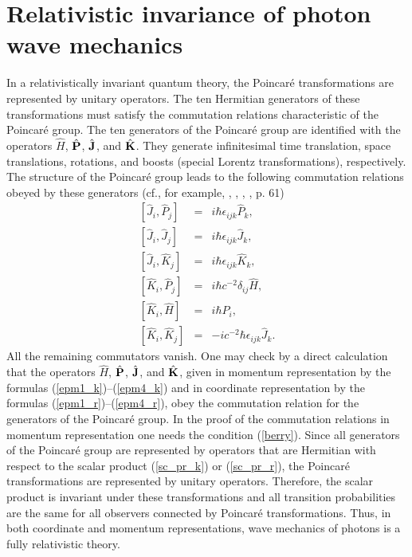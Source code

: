 \documentclass[11pt]{article}
\begin{document}
\section[RELATIVISTIC INVARIANCE]{Relativistic invariance of photon wave
mechanics\label{invariance}}

In a relativistically invariant quantum theory, the Poincar\'e
transformations are represented by unitary operators. The ten Hermitian
generators of these transformations must satisfy the commutation relations
characteristic of the Poincar\'e group. The ten generators of the Poincar\'e
group are identified with the operators ${\hat H}$, ${\hat{\bf P}}$,
${\hat{\bf J}}$, and ${\hat{\bf K}}$. They generate infinitesimal time
translation, space translations, rotations, and boosts (special Lorentz
transformations), respectively. The structure of the Poincar\'e group leads
to the following commutation relations obeyed by these generators (cf., for
example, \cite{BW_48}, \cite{BBBB_75}, \cite{IZ_80}, \cite{Weinberg_95}, p.
61)
\begin{eqnarray}
 \left[{\hat J}_i,{\hat P}_j\right] &=& i\hbar \epsilon_{ijk}{\hat P}_k,
 \label{cmp}\\
 \left[{\hat J}_i,{\hat J}_j\right] &=& i\hbar \epsilon_{ijk}{\hat J}_k,
 \label{cmm}\\
 \left[{\hat J}_i,{\hat K}_j\right] &=& i\hbar \epsilon_{ijk}{\hat K}_k,
 \label{cmn}\\
 \left[{\hat K}_i,{\hat P}_j\right] &=& i\hbar  c^{-2}\delta_{ij}{\hat H},
 \label{cnp}\\
 \left[{\hat K}_i,{\hat H}\right] &=& i\hbar {\hat P}_i,\label{cne}\\
 \left[{\hat K}_i,{\hat K}_j\right]
 &=& -ic^{-2}\hbar\epsilon_{ijk}{\hat J}_k.\label{cnn}
\end{eqnarray}
All the remaining commutators vanish. One may check by a direct calculation
that the operators ${\hat H}$, ${\hat{\bf P}}$, ${\hat{\bf J}}$, and
${\hat{\bf K}}$, given in momentum representation by the formulas
(\ref{epm1_k})--(\ref{epm4_k}) and in coordinate representation by the
formulas (\ref{epm1_r})--(\ref{epm4_r}), obey the commutation relation for
the generators of the Poincar\'e group. In the proof of the commutation
relations in momentum representation one needs the condition (\ref{berry}).
Since all generators of the Poincar\'e group are represented by operators
that are Hermitian with respect to the scalar product (\ref{sc_pr_k}) or
(\ref{sc_pr_r}), the Poincar\'e transformations are represented by unitary operators. Therefore, the scalar product is invariant under these
transformations and all transition probabilities are the same for all
observers connected by Poincar\'e transformations. Thus, in both coordinate
and momentum representations, wave mechanics of photons is a fully
relativistic theory.
\end{document}
